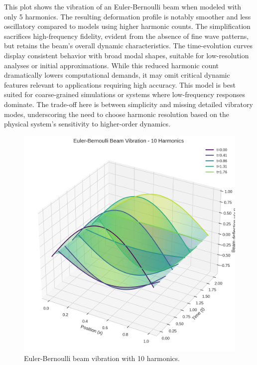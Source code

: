 \documentclass[preprint,12pt]{elsarticle}
\begin{document}
This plot shows the vibration of an Euler-Bernoulli beam when modeled with only 5 harmonics. The resulting deformation profile is notably smoother and less oscillatory compared to models using higher harmonic counts. The simplification sacrifices high-frequency fidelity, evident from the absence of fine wave patterns, but retains the beam’s overall dynamic characteristics. The time-evolution curves display consistent behavior with broad modal shapes, suitable for low-resolution analyses or initial approximations. While this reduced harmonic count dramatically lowers computational demands, it may omit critical dynamic features relevant to applications requiring high accuracy. This model is best suited for coarse-grained simulations or systems where low-frequency responses dominate. The trade-off here is between simplicity and missing detailed vibratory modes, underscoring the need to choose harmonic resolution based on the physical system’s sensitivity to higher-order dynamics.

\begin{figure}[t]
    \centering
    \includegraphics[width=0.9\linewidth]{figures/euler_bernoulli_3d_10h.png}
    \caption{Euler-Bernoulli beam vibration with 10 harmonics.}
    \label{fig:euler_10h}
\end{figure}
\end{document}
